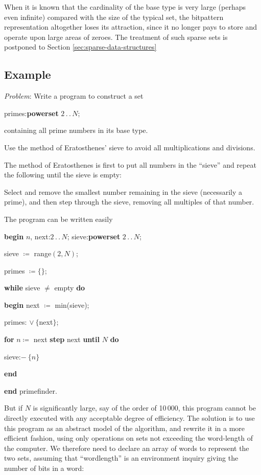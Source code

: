 When it is known that the cardinality of the base type is very large (perhaps even infinite) compared with the size of the typical set, the bitpattern representation altogether loses its attraction, since it no longer pays to store and operate upon large areas of zeroes. The treatment of such sparse sets is postponed to Section \ref{sec:sparse-data-structures}

\subsection{Example}

\noindent
\textit{Problem}: Write a program to construct a set

\quad primes:\textbf{powerset} $2\,.\,.\,N$;

\noindent
containing all prime numbers in its base type.

\noindent
Use the method of Eratosthenes' sieve to avoid all multiplications and divisions.

The method of Eratosthenes is first to put all numbers in the ``sieve'' and repeat the following until the sieve is empty:

\noindent
Select and remove the smallest number remaining in the sieve (necessarily a prime), and then step through the sieve, removing all multiples of that number.

The program can be written easily

\noindent
\textbf{begin} $n$, next:$2\,.\,.\,N$; sieve:\textbf{powerset} $2\,.\,.\,N$;

\noindent
\quad sieve $\coloneq$ range$(2, N)$;

\noindent
\quad primes $\coloneq \{\}$;

\noindent
\quad \textbf{while} sieve $\neq$ empty \textbf{do}

\noindent
\quad \quad \textbf{begin} next $\coloneq$ min(sieve);

\noindent
\quad \quad \quad primes: $\vee\ \{$next$\}$;

\noindent
\quad \quad \quad \textbf{for} $n\coloneq$ next \textbf{step} next \textbf{until} $N$ \textbf{do}

\noindent
\quad \quad \quad \quad sieve:$-\ \{n\}$

\noindent
\quad \quad \textbf{end}

\noindent
\textbf{end} primefinder.

But if $N$ is significantly large, say of the order of 10\,000, this program cannot be directly executed with any acceptable degree of efficiency. The solution is to use this program as an abstract model of the algorithm, and rewrite it in a more efficient fashion, using only operations on sets not exceeding the word-length of the computer. We therefore need to declare an array of words to represent the two sets, assuming that ``wordlength'' is an environment inquiry giving the number of bits in a word:

